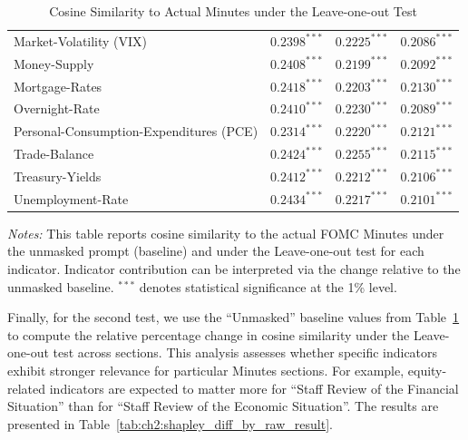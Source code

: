 \begin{table}[htbp]
\begin{threeparttable}
\begin{tabular}{p{3.6cm} p{4.3cm} p{3.1cm} p{3.1cm}}
Market-Volatility (VIX) & $0.2398^{***}$ & $0.2225^{***}$ & $0.2086^{***}$ \\
Money-Supply & $0.2408^{***}$ & $0.2199^{***}$ & $0.2092^{***}$ \\
Mortgage-Rates & $0.2418^{***}$ & $0.2203^{***}$ & $0.2130^{***}$ \\
Overnight-Rate & $0.2410^{***}$ & $0.2230^{***}$ & $0.2089^{***}$ \\
Personal-Consumption-Expenditures (PCE) & $0.2314^{***}$ & $0.2220^{***}$ & $0.2121^{***}$ \\
Trade-Balance & $0.2424^{***}$ & $0.2255^{***}$ & $0.2115^{***}$ \\
Treasury-Yields & $0.2412^{***}$ & $0.2212^{***}$ & $0.2106^{***}$ \\
Unemployment-Rate & $0.2434^{***}$ & $0.2217^{***}$ & $0.2101^{***}$ \\
\bottomrule
\end{tabular}
\begin{tablenotes}[flushleft]
\footnotesize

\item \textit{Notes:} This table reports cosine similarity to the actual FOMC Minutes under the unmasked prompt (baseline) and under the Leave-one-out test for each indicator. Indicator contribution can be interpreted via the change relative to the unmasked baseline. 
$^{***}$ denotes statistical significance at the 1\% level.
\end{tablenotes}

\caption{Cosine Similarity to Actual Minutes under the Leave-one-out Test}
\label{tab:ch2:shapley_by_raw_result}
\end{threeparttable}
\end{table}


Finally, for the second test, we use the ``Unmasked'' baseline values from Table~\ref{tab:ch2:shapley_by_raw_result} to compute the relative percentage change in cosine similarity under the Leave-one-out test across sections. This analysis assesses whether specific indicators exhibit stronger relevance for particular Minutes sections. For example, equity-related indicators are expected to matter more for ``Staff Review of the Financial Situation'' than for ``Staff Review of the Economic Situation''. The results are presented in Table~\ref{tab:ch2:shapley_diff_by_raw_result}.


